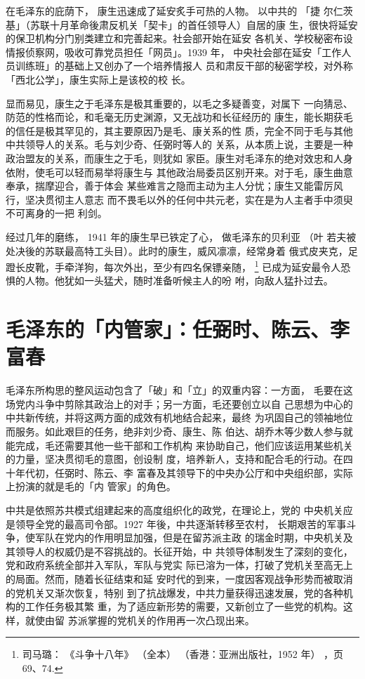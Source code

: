 在毛泽东的庇荫下，
康生迅速成了延安炙手可热的人物。
以中共的
「捷
尔仁茨基」（苏联十月革命後肃反机关「契卡」的首任领导人）自居的康
生，很快将延安的保卫机构分门别类建立和完善起来。社会部开始在延安
各机关、学校秘密布设情报侦察网，吸收可靠党员担任「网员」。1939 年，
中央社会部在延安「工作人员训练班」的基础上又创办了一个培养情报人
员和肃反干部的秘密学校，对外称「西北公学」，康生实际上是该校的校
长。

显而易见，康生之于毛泽东是极其重要的，以毛之多疑善变，对属下
一向猜忌、防范的性格而论，和毛毫无历史渊源，又无战功和长征经历的
康生，能长期获毛的信任是极其罕见的，其主要原因乃是毛、康关系的性
质，完全不同于毛与其他中共领导人的关系。毛与刘少奇、任弼时等人的
关系，从本质上说，主要是一种政治盟友的关系，而康生之于毛，则犹如
家臣。康生对毛泽东的绝对效忠和人身依附，使毛可以轻而易举将康生与
其他政治局委员区别开来。对于毛，康生曲意奉承，揣摩迎合，善于体会
某些难言之隐而主动为主人分忧；康生又能雷厉风行，坚决贯彻主人意志
而不畏毛以外的任何中共元老，实在是为人主者手中须臾不可离身的一把
利剑。

经过几年的磨练，
1941 年的康生早已铁定了心，
做毛泽东的贝利亚
（叶
若夫被处决後的苏联最高特工头目）。此时的康生，威风凛凛，经常身着
俄式皮夹克，足蹬长皮靴，手牵洋狗，每次外出，至少有四名保镖亲随，
\footnote{司马璐：
《斗争十八年》
（全本）
（香港：亚洲出版社，1952 年）
，页 69、74. 
}
已成为延安最令人恐惧的人物。他犹如一头猛犬，随时准备听候主人的吩
咐，向敌人猛扑过去。

\section{ 毛泽东的「内管家」：任弼时、陈云、李富春}
毛泽东所构思的整风运动包含了「破」和「立」的双重内容：一方面，
毛要在这场党内斗争中剪除其政治上的对手；另一方面，毛还要创立以自
己思想为中心的中共新传统，并将这两方面的成效有机地结合起来，最终
为巩固自己的领袖地位而服务。如此艰巨的任务，绝非刘少奇、康生、陈
伯达、胡乔木等少数人参与就能完成，毛还需要其他一些干部和工作机构
来协助自己，他们应该运用某些机关的力量，坚决贯彻毛的意图，创设制
度，培养新人，支持和配合毛的行动。在四十年代初，任弼时、陈云、李
富春及其领导下的中央办公厅和中央组织部，实际上扮演的就是毛的「内
管家」的角色。

中共是依照苏共模式组建起来的高度组织化的政党，在理论上，党的
中央机关应是领导全党的最高司令部。1927 年後，中共逐渐转移至农村，
长期艰苦的军事斗争，使军队在党内的作用明显加强，但是在留苏派主政
的瑞金时期，中央机关及其领导人的权威仍是不容挑战的。长征开始，中
共领导体制发生了深刻的变化，党和政府系统全部并入军队，军队与党实
际已溶为一体，打破了党机关至高无上的局面。然而，随着长征结束和延
安时代的到来，一度因客观战争形势而被取消的党机关又渐次恢复，特别
到了抗战爆发，中共力量获得迅速发展，党的各种机构的工作任务极其繁
重，为了适应新形势的需要，又新创立了一些党的机构。这样，就使由留
苏派掌握的党机关的作用再一次凸现出来。

